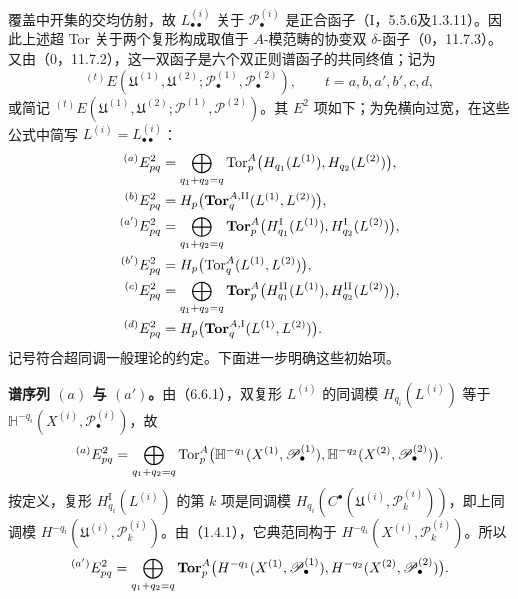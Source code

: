 覆盖中开集的交均仿射，故 $L^{(i)}_{\bullet\bullet}$ 关于 $\mathscr P^{(i)}_\bullet$ 是正合函子（I，5.5.6及1.3.11）。因此上述超 Tor 关于两个复形构成取值于 $A$-模范畴的协变双 $\delta$-函子（0，11.7.3）。又由（0，11.7.2），这一双函子是六个双正则谱函子的共同终值；记为
\[
 {}^{(t)}E(\mathfrak U^{(1)},\mathfrak U^{(2)};
             \mathscr P^{(1)}_\bullet,\mathscr P^{(2)}_\bullet),
 \qquad t=a,b,a',b',c,d,
\]
或简记 ${}^{(t)}E(\mathfrak U^{(1)},\mathfrak U^{(2)};\mathscr P^{(1)},\mathscr P^{(2)})$。其 $E^2$ 项如下；为免横向过宽，在这些公式中简写 $L^{(i)}=L^{(i)}_{\bullet\bullet}$：
\begin{align*}
 {}^{(a)}E^2_{pq}
 &=\bigoplus_{q_1+q_2=q}\operatorname{Tor}^A_p
       \bigl(H_{q_1}(L^{(1)}),H_{q_2}(L^{(2)})\bigr),\\
 {}^{(b)}E^2_{pq}
 &=H_p\bigl(\operatorname{\mathbf{Tor}}^{A,\mathrm{II}}_q(L^{(1)},L^{(2)})\bigr),\\
 {}^{(a')}E^2_{pq}
 &=\bigoplus_{q_1+q_2=q}\operatorname{\mathbf{Tor}}^A_p
       \bigl(H^{\mathrm I}_{q_1}(L^{(1)}),H^{\mathrm I}_{q_2}(L^{(2)})\bigr),\\
 {}^{(b')}E^2_{pq}
 &=H_p\bigl(\operatorname{Tor}^A_q(L^{(1)},L^{(2)})\bigr),\\
 {}^{(c)}E^2_{pq}
 &=\bigoplus_{q_1+q_2=q}\operatorname{\mathbf{Tor}}^A_p
       \bigl(H^{\mathrm{II}}_{q_1}(L^{(1)}),H^{\mathrm{II}}_{q_2}(L^{(2)})\bigr),\\
 {}^{(d)}E^2_{pq}
 &=H_p\bigl(\operatorname{\mathbf{Tor}}^{A,\mathrm I}_q(L^{(1)},L^{(2)})\bigr).
\end{align*}
记号符合超同调一般理论的约定。下面进一步明确这些初始项。

\textbf{谱序列 $(a)$ 与 $(a')$。}由（6.6.1），双复形 $L^{(i)}$ 的同调模 $H_{q_i}(L^{(i)})$ 等于 $\mathbb H^{-q_i}(X^{(i)},\mathscr P^{(i)}_\bullet)$，故
\[
 {}^{(a)}E^2_{pq}=
 \bigoplus_{q_1+q_2=q}\operatorname{Tor}^A_p
 \bigl(\mathbb H^{-q_1}(X^{(1)},\mathscr P^{(1)}_\bullet),
       \mathbb H^{-q_2}(X^{(2)},\mathscr P^{(2)}_\bullet)\bigr).
\]
按定义，复形 $H^{\mathrm I}_{q_i}(L^{(i)})$ 的第 $k$ 项是同调模
$H_{q_i}(C^\bullet(\mathfrak U^{(i)},\mathscr P^{(i)}_k))$，即上同调模
$H^{-q_i}(\mathfrak U^{(i)},\mathscr P^{(i)}_k)$。由（1.4.1），它典范同构于
$H^{-q_i}(X^{(i)},\mathscr P^{(i)}_k)$。所以
\[
 {}^{(a')}E^2_{pq}=
 \bigoplus_{q_1+q_2=q}\operatorname{\mathbf{Tor}}^A_p
 \bigl(H^{-q_1}(X^{(1)},\mathscr P^{(1)}_\bullet),
       H^{-q_2}(X^{(2)},\mathscr P^{(2)}_\bullet)\bigr).
\]

